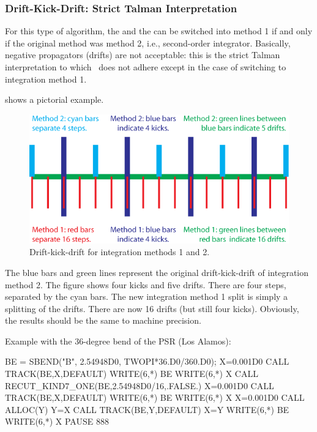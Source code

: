 \subsubsection{Drift-Kick-Drift: Strict Talman Interpretation}

For this type of algorithm, the  and the
 can be switched into method 1 if and only if
the original method was method 2, i.e., second-order integrator.
Basically, negative propagators (drifts) are not acceptable: this is the
strict Talman interpretation to which \PTC\ does not adhere except in the
case of switching to integration method 1.

 shows a pictorial example.

\begin{figure}[ht]
  \centering
  \includegraphics{illustrations/recutDKD}
  \caption{Drift-kick-drift for integration methods 1 and 2.}
  \label{fig:Drift-kick-drift}
\end{figure}

The blue bars and green lines represent the original drift-kick-drift of integration
method 2. The figure shows four kicks and five drifts. There
are four steps, separated by the cyan bars. The new integration method 1
split is simply a splitting of the drifts. There are now 16 drifts (but still 
four kicks). Obviously, the results should be the same to machine precision. 

Example with the 36-degree bend of the PSR (Los Alamos):

\begin{ptccode}
BE  = SBEND("B", 2.54948D0, TWOPI*36.D0/360.D0);
  X=0.001D0
  CALL TRACK(BE,X,DEFAULT)
  WRITE(6,*) BE%
  WRITE(6,*) X
    CALL RECUT_KIND7_ONE(BE,2.54948D0/16,.FALSE.)
X=0.001D0
  CALL TRACK(BE,X,DEFAULT)
  WRITE(6,*) BE%
  WRITE(6,*) X
X=0.001D0
  CALL ALLOC(Y)
  Y=X
  CALL TRACK(BE,Y,DEFAULT)
  X=Y
  WRITE(6,*) BE%
  WRITE(6,*) X
  PAUSE 888
\end{ptccode}

